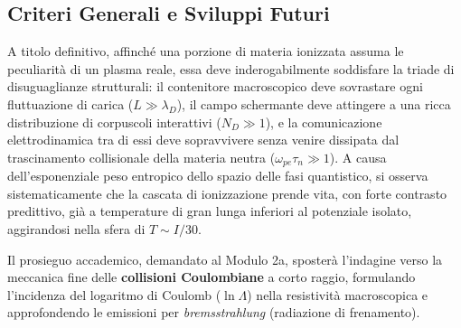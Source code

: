 \subsection{Criteri Generali e Sviluppi Futuri}
A titolo definitivo, affinché una porzione di materia ionizzata assuma le peculiarità di un plasma reale, essa deve inderogabilmente soddisfare la triade di disuguaglianze strutturali: il contenitore macroscopico deve sovrastare ogni fluttuazione di carica ($L \gg \lambda_D$), il campo schermante deve attingere a una ricca distribuzione di corpuscoli interattivi ($N_D \gg 1$), e la comunicazione elettrodinamica tra di essi deve sopravvivere senza venire dissipata dal trascinamento collisionale della materia neutra ($\omega_{pe} \tau_n \gg 1$).
A causa dell'esponenziale peso entropico dello spazio delle fasi quantistico, si osserva sistematicamente che la cascata di ionizzazione prende vita, con forte contrasto predittivo, già a temperature di gran lunga inferiori al potenziale isolato, aggirandosi nella sfera di $T \sim I/30$.

Il prosieguo accademico, demandato al Modulo 2a, sposterà l'indagine verso la meccanica fine delle \textbf{collisioni Coulombiane} a corto raggio, formulando l'incidenza del logaritmo di Coulomb ($\ln \Lambda$) nella resistività macroscopica e approfondendo le emissioni per \textit{bremsstrahlung} (radiazione di frenamento).